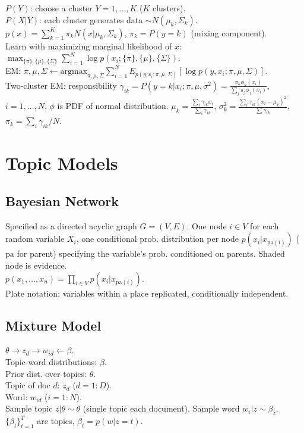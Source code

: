 $P(Y)$: choose a cluster $Y=1, \dots, K$ ($K$ clusters).\\
$P(X|Y)$: each cluster generates data $\sim N(\mu_k, \Sigma_k)$.\\
$p(x) = \sum_{k=1}^K \pi_k N(x|\mu_k, \Sigma_k)$, $\pi_k=P(y=k)$ (mixing component).\\
Learn with maximizing marginal likelihood of $x$: $\max_{\{\pi\}, \{\mu\}, \{\Sigma\}}\sum_{i=1}^N\log p(x_i; \{\pi\},\{\mu\},\{\Sigma\})$.\\
EM: $\pi, \mu, \Sigma \leftarrow \text{argmax}_{\pi, \mu, \Sigma}\sum_{i=1}^N E_{p(y|x_i;\pi,\mu,\Sigma)}[\log p(y,x_i;\pi,\mu,\Sigma)]$.\\
Two-cluster EM: responsibility $\gamma_{ik} = P(y=k|x_i;\pi,\mu,\sigma^2) =  \frac{\pi_k\phi_k(x_i)}{\sum_j \pi_j \phi_j(x_i)}$, $i=1, \dots, N$, $\phi$ is PDF of normal distribution. $\mu_k=\frac{\sum_i \gamma_{ik} x_i}{\sum_i \gamma_{ik}}$, $\sigma_k^2=\frac{\sum_i \gamma_{ik} (x_i-\mu_k)^2}{\sum \gamma_{ik}}$, $\pi_k = \sum_i \gamma_{ik}/N$.

\section{Topic Models}

\subsection*{Bayesian Network}

Specified as a directed acyclic graph $G = (V, E)$. One node $i \in V$ for each random variable $X_i$, one conditional prob. distribution per node $p(x_i|x_{\text{pa}(i)})$ ($\text{pa}$ for parent) specifying the variable's prob. conditioned on parents. Shaded node is evidence.\\
$p(x_1, \dots, x_n) = \prod_{i\in V}p(x_i|x_{\text{pa}(i)})$.\\
Plate notation: variables within a place replicated, conditionally independent.

\subsection*{Mixture Model}

$\theta \rightarrow z_d \rightarrow w_{id} \leftarrow \beta$.\\
Topic-word distributions: $\beta$.\\
Prior dist. over topics: $\theta$.\\
Topic of doc $d$: $z_d$ ($d=1:D$).\\
Word: $w_{id}$ ($i = 1 : N$).\\
Sample topic $z|\theta \sim \theta$ (single topic each document). Sample word $w_i|z \sim \beta_z$. $\{\beta_t\}_{t=1}^T$ are topics, $\beta_t=p(w|z=t)$.

